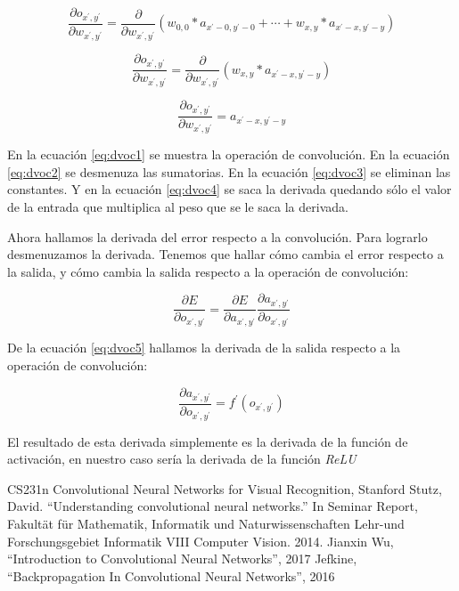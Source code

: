 \documentclass[a4paper,12pt]{article}
\begin{document}
\begin{equation}\label{eq:dvoc2}
\frac{\partial o_{x^{'},y^{'}}}{\partial w_{x^{'},y^{'}}} = \frac{\partial}{\partial w_{x^{'},y^{'}}} (w_{0,0} * a_{x^{'} - 0,y^{'} - 0} + \cdots + w_{x,y} * a_{x^{'} - x,y^{'} - y})
\end{equation}

\begin{equation}\label{eq:dvoc3}
\frac{\partial o_{x^{'},y^{'}}}{\partial w_{x^{'},y^{'}}} = \frac{\partial}{\partial w_{x^{'},y^{'}}} (w_{x,y} * a_{x^{'} - x,y^{'} - y})
\end{equation}

\begin{equation}\label{eq:dvoc4}
\frac{\partial o_{x^{'},y^{'}}}{\partial w_{x^{'},y^{'}}} = a_{x^{'} - x,y^{'} - y}
\end{equation}

En la ecuación \ref{eq:dvoc1} se muestra la operación de convolución. En la ecuación \ref{eq:dvoc2} se desmenuza las sumatorias.
En la ecuación \ref{eq:dvoc3} se eliminan las constantes. Y en la ecuación \ref{eq:dvoc4} se saca la derivada quedando sólo el valor
de la entrada que multiplica al peso que se le saca la derivada. \par

Ahora hallamos la derivada del error respecto a la convolución. Para lograrlo desmenuzamos la derivada. Tenemos que hallar cómo 
cambia el error respecto a la salida, y cómo cambia la salida respecto a la operación de convolución:

\begin{equation}\label{eq:dvoc5}
\frac{\partial E}{\partial o_{x^{'},y^{'}}} = \frac{\partial E}{\partial a_{x^{'},y^{'}}} \frac{\partial a_{x^{'},y^{'}}}{\partial o_{x^{'},y^{'}}}
\end{equation}

De la ecuación \ref{eq:dvoc5} hallamos la derivada de la salida respecto a la operación de convolución:

\begin{equation}\label{eq:dvoc6}
\frac{\partial a_{x^{'},y^{'}}}{\partial o_{x^{'},y^{'}}} = f^{'}(o_{x^{'},y^{'}})
\end{equation}

El resultado de esta derivada simplemente es la derivada de la función de activación, en nuestro caso sería la derivada
de la función \textit{ReLU}






\begin{thebibliography}{1}
 CS231n Convolutional Neural Networks for Visual Recognition, Stanford
 Stutz, David. ``Understanding convolutional neural networks.'' In Seminar Report, Fakultät für Mathematik, Informatik und Naturwissenschaften Lehr-und Forschungsgebiet Informatik VIII Computer Vision. 2014.
  Jianxin Wu, ``Introduction to Convolutional Neural Networks'', 2017
 Jefkine, ``Backpropagation In Convolutional Neural Networks'', 2016
\end{thebibliography}
\end{document}

